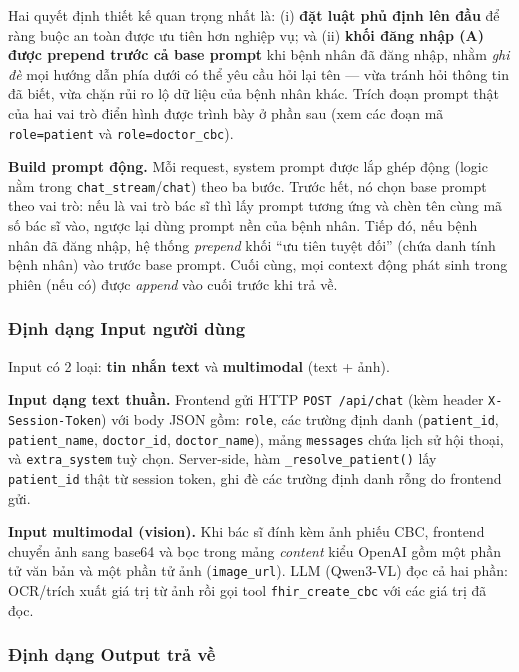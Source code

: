 \documentclass[a4paper,13pt,3p,twoside,openany]{report}
\theoremstyle{definition}
\theoremstyle{remark}
\theoremstyle{definition}
\begin{document}
Hai quyết định thiết kế quan trọng nhất là: (i) \textbf{đặt luật phủ định lên đầu} để ràng buộc an toàn được ưu tiên hơn nghiệp vụ; và (ii) \textbf{khối đăng nhập (A) được prepend trước cả base prompt} khi bệnh nhân đã đăng nhập, nhằm \textit{ghi đè} mọi hướng dẫn phía dưới có thể yêu cầu hỏi lại tên --- vừa tránh hỏi thông tin đã biết, vừa chặn rủi ro lộ dữ liệu của bệnh nhân khác. Trích đoạn prompt thật của hai vai trò điển hình được trình bày ở phần sau (xem các đoạn mã \texttt{role=patient} và \texttt{role=doctor\_cbc}).

\textbf{Build prompt động.} Mỗi request, system prompt được lắp ghép động (logic nằm trong \texttt{chat\_stream}/\texttt{chat}) theo ba bước. Trước hết, nó chọn base prompt theo vai trò: nếu là vai trò bác sĩ thì lấy prompt tương ứng và chèn tên cùng mã số bác sĩ vào, ngược lại dùng prompt nền của bệnh nhân. Tiếp đó, nếu bệnh nhân đã đăng nhập, hệ thống \textit{prepend} khối ``ưu tiên tuyệt đối'' (chứa danh tính bệnh nhân) vào trước base prompt. Cuối cùng, mọi context động phát sinh trong phiên (nếu có) được \textit{append} vào cuối trước khi trả về.

\subsubsection{Định dạng Input người dùng}

Input có 2 loại: \textbf{tin nhắn text} và \textbf{multimodal} (text + ảnh).

\textbf{Input dạng text thuần.} Frontend gửi HTTP \texttt{POST /api/chat} (kèm header \texttt{X-Session-Token}) với body JSON gồm: \texttt{role}, các trường định danh (\texttt{patient\_id}, \texttt{patient\_name}, \texttt{doctor\_id}, \texttt{doctor\_name}), mảng \texttt{messages} chứa lịch sử hội thoại, và \texttt{extra\_system} tuỳ chọn. Server-side, hàm \texttt{\_resolve\_patient()} lấy \texttt{patient\_id} thật từ session token, ghi đè các trường định danh rỗng do frontend gửi.

\textbf{Input multimodal (vision).} Khi bác sĩ đính kèm ảnh phiếu CBC, frontend chuyển ảnh sang base64 và bọc trong mảng \textit{content} kiểu OpenAI gồm một phần tử văn bản và một phần tử ảnh (\texttt{image\_url}). LLM (Qwen3-VL) đọc cả hai phần: OCR/trích xuất giá trị từ ảnh rồi gọi tool \texttt{fhir\_create\_cbc} với các giá trị đã đọc.

\subsubsection{Định dạng Output trả về}
\end{document}
